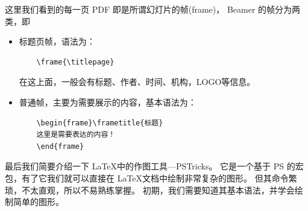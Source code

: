 这里我们看到的每一页 PDF 即是所谓幻灯片的帧(frame)，
Beamer 的帧分为两类，即
\begin{itemize}
	\item 标题页帧，语法为：
	\begin{verbatim}
	\frame{\titlepage}
	\end{verbatim}
	在这上面，一般会有标题、作者、时间、机构，LOGO等信息。
	\item 普通帧，主要为需要展示的内容，基本语法为：
	\begin{verbatim}
	\begin{frame}\frametitle{标题}
  	这里是需要表达的内容！
	\end{frame}
	\end{verbatim}
\end{itemize}

最后我们简要介绍一下 \LaTeX 中的作图工具---PSTricks。
它是一个基于 PS 的宏包，有了它我们就可以直接在 \LaTeX 文档中绘制非常复杂的图形。
但其命令繁琐，不太直观，所以不易熟练掌握。
初期，我们需要知道其基本语法，并学会绘制简单的图形。

